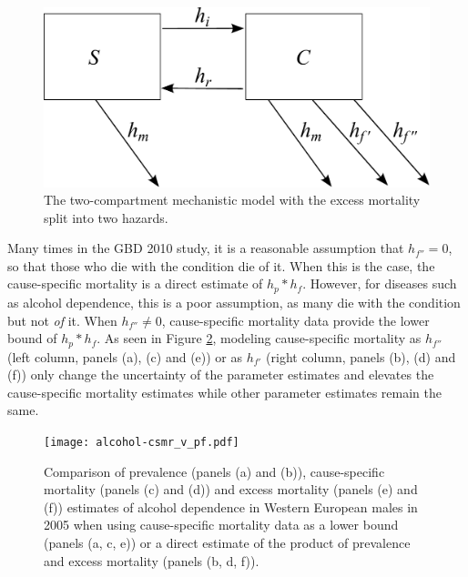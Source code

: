     \begin{figure}[h]
        \begin{center}
            \includegraphics[width=\textwidth]{SC2.pdf}
            \caption{The two-compartment mechanistic model with the
              excess mortality split into two hazards.}
            \label{fig:two_compartment_2f}
        \end{center}
    \end{figure}

Many times in the GBD 2010 study, it is a reasonable assumption that
$h_{f''} = 0$, so that those who die with the condition die of it.
When this is the case, the cause-specific mortality is a direct
estimate of $h_{p}*h_{f}$.  However, for diseases such as alcohol
dependence, this is a poor assumption, as many die with the condition
but not \emph{of} it.  When $h_{f''} \neq 0$, cause-specific mortality
data provide the lower bound of $h_{p}*h_{f}$.  As seen in Figure
\ref{fig:app-alcohol compare}, modeling cause-specific mortality as
$h_{f''}$ (left column, panels (a), (c) and (e)) or as $h_{f'}$ (right
column, panels (b), (d) and (f)) only change the uncertainty of the
parameter estimates and elevates the cause-specific mortality
estimates while other parameter estimates remain the same.

    \begin{figure}[h]
        \begin{center}
            \texttt{[image: alcohol-csmr\_v\_pf.pdf]}
            \caption{Comparison of prevalence (panels (a) and (b)),
              cause-specific mortality (panels (c) and (d)) and excess
              mortality (panels (e) and (f)) estimates of alcohol
              dependence in Western European males in 2005 when using
              cause-specific mortality data as a lower bound (panels
              (a, c, e)) or a direct estimate of the product of
              prevalence and excess mortality (panels (b, d, f)).}
            \label{fig:app-alcohol compare}
        \end{center}
    \end{figure} 
